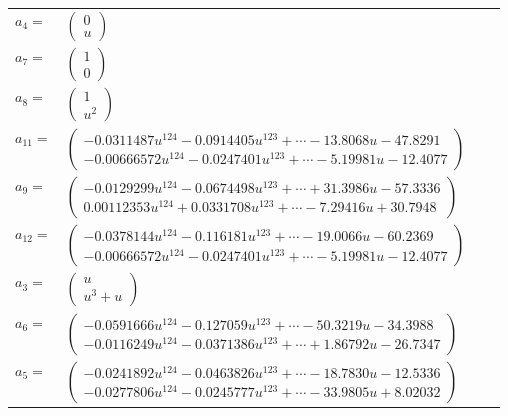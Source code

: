 \documentclass[1p]{elsarticle_modified}
\theoremstyle{definition}
\begin{document}
\begin{tabular}{m{7pt} m{180pt} m{7pt} m{180pt} }
\flushright $a_{4}=$&$\begin{pmatrix}0\\u\end{pmatrix}$ \\
\flushright $a_{7}=$&$\begin{pmatrix}1\\0\end{pmatrix}$ \\
\flushright $a_{8}=$&$\begin{pmatrix}1\\u^2\end{pmatrix}$ \\
\flushright $a_{11}=$&$\begin{pmatrix}-0.0311487 u^{124}-0.0914405 u^{123}+\cdots-13.8068 u-47.8291\\-0.00666572 u^{124}-0.0247401 u^{123}+\cdots-5.19981 u-12.4077\end{pmatrix}$ \\
\flushright $a_{9}=$&$\begin{pmatrix}-0.0129299 u^{124}-0.0674498 u^{123}+\cdots+31.3986 u-57.3336\\0.00112353 u^{124}+0.0331708 u^{123}+\cdots-7.29416 u+30.7948\end{pmatrix}$ \\
\flushright $a_{12}=$&$\begin{pmatrix}-0.0378144 u^{124}-0.116181 u^{123}+\cdots-19.0066 u-60.2369\\-0.00666572 u^{124}-0.0247401 u^{123}+\cdots-5.19981 u-12.4077\end{pmatrix}$ \\
\flushright $a_{3}=$&$\begin{pmatrix}u\\u^3+u\end{pmatrix}$ \\
\flushright $a_{6}=$&$\begin{pmatrix}-0.0591666 u^{124}-0.127059 u^{123}+\cdots-50.3219 u-34.3988\\-0.0116249 u^{124}-0.0371386 u^{123}+\cdots+1.86792 u-26.7347\end{pmatrix}$ \\
\flushright $a_{5}=$&$\begin{pmatrix}-0.0241892 u^{124}-0.0463826 u^{123}+\cdots-18.7830 u-12.5336\\-0.0277806 u^{124}-0.0245777 u^{123}+\cdots-33.9805 u+8.02032\end{pmatrix}$ \\

\end{tabular}
\end{document}
